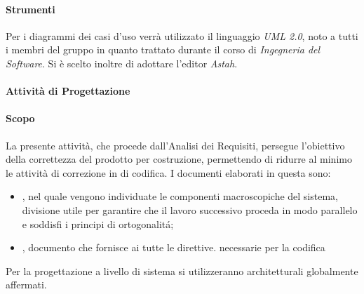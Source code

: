 			\paragraph*{Strumenti}
				Per i diagrammi dei casi d'uso verrà utilizzato il linguaggio \textit{UML 2.0},
				noto a tutti i membri del gruppo in quanto trattato durante il corso
				di \textit{Ingegneria del Software}.
				Si \`e scelto inoltre di adottare l'editor  \textit{Astah}.   %
			
			
		\paragraph*{Attività di Progettazione}
			\paragraph*{Scopo}
		        La presente attivit\`a, che procede dall'Analisi dei Requisiti, persegue l'obiettivo
		        della correttezza del prodotto per costruzione, permettendo di ridurre al minimo le attività di correzione
		        in  di codifica.
                        I documenti elaborati in questa  sono:
                        \begin{itemize}
                        \item {}, nel quale vengono individuate le componenti macroscopiche del sistema,
                          divisione utile per garantire che il lavoro successivo proceda in modo parallelo e soddisfi i principi di ortogonalit\'a;
                        \item {}, documento che fornisce ai  tutte le direttive. necessarie per la codifica
                        \end{itemize}
		        Per la progettazione a livello di sistema si utilizzeranno  architetturali globalmente affermati.
                 
